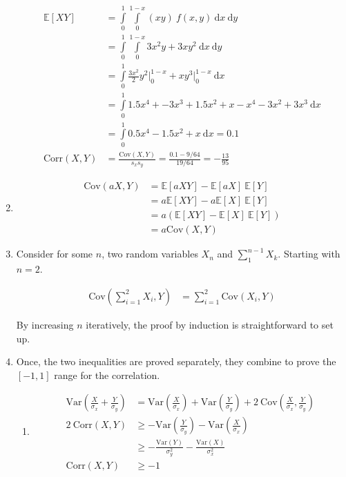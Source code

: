 \begin{enumerate}
		\begin{align}
			\mathbb{E}[XY] &= \int\limits_{0}^{1} \int\limits_{0}^{1-x}  (xy) \ f(x, y) \ \mathrm{d}x \ \mathrm{d}y \nonumber \\
			&= \int\limits_{0}^{1} \int\limits_{0}^{1-x}  3x^2 y + 3x y^2 \ \mathrm{d}x \ \mathrm{d}y \nonumber \\
			&= \int\limits_{0}^{1}  \frac{3x^2}{2} y^2 \Big|_0^{1-x} + x y^3 \Big|_0^{1-x} \ \mathrm{d}x \nonumber \\
			&= \int\limits_{0}^{1}  1.5x^4 + -3x^3 + 1.5x^2 + x - x^4 - 3x^2 + 3x^3  \ \mathrm{d}x \nonumber \\
			&= \int\limits_{0}^{1}  0.5x^4 - 1.5x^2 + x \ \mathrm{d}x \nonumber = 0.1 \\
			\mathrm{Corr}(X, Y) &= \frac{\mathrm{Cov}(X, Y)}{s_x s_y} = \frac{0.1 - 9/64}{19/64} = -\frac{13}{95}
		\end{align}
	
	
	\item 
		\begin{align}
			\mathrm{Cov}(aX, Y) &= \mathbb{E}[aXY] - \mathbb{E}[aX] \ \mathbb{E}[Y] \nonumber \\
			&= a \mathbb{E}[XY] - a\mathbb{E}[X] \ \mathbb{E}[Y] \nonumber \\
			&= a \left(\mathbb{E}[XY] - \mathbb{E}[X] \ \mathbb{E}[Y]\right) \nonumber \\
			&= a \mathrm{Cov}(X, Y)
		\end{align}
	
	
	\item Consider for some $ n $, two random variables $ X_n $ and $ \sum_{1}^{n-1} X_k$. Starting with $ n = 2 $.
	
	\begin{align}
		\mathrm{Cov}\left(\sum\limits_{i = 1}^{2}X_i, Y\right) &= \sum\limits_{i = 1}^{2} \mathrm{Cov}(X_i, Y) 
	\end{align}
	
	By increasing $ n $ iteratively, the proof by induction is straightforward to set up.
	
	\item Once, the two inequalities are proved separately, they combine to prove the $ [-1, 1] $ range for the correlation.
	
		\begin{enumerate}
			
			\item \begin{align}
				\mathrm{Var}\left(\frac{X}{\sigma_x} + \frac{Y}{\sigma_y}\right) &=\mathrm{Var}\left(\frac{X}{\sigma_x}\right) +  \mathrm{Var}\left(\frac{Y}{\sigma_y}\right) + 2\ \mathrm{Cov}\left(\frac{X}{\sigma_x}, \frac{Y}{\sigma_y}\right)  \nonumber \\
				2\ \mathrm{Corr}(X, Y) &\geq - \mathrm{Var}\left(\frac{Y}{\sigma_y}\right) - \mathrm{Var}\left(\frac{X}{\sigma_x}\right) \\
				&\geq - \frac{\mathrm{Var}(Y)}{\sigma_y^2} - \frac{\mathrm{Var}(X)}{\sigma_x^2} \\
				\mathrm{Corr}(X, Y) &\geq - 1 
			\end{align}
			

\end{enumerate}
\end{enumerate}
